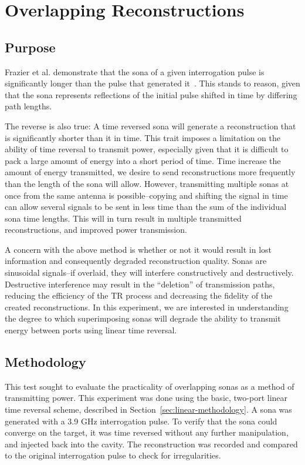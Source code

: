 \section{Overlapping Reconstructions}
\label{sec:overlapping}

\subsection{Purpose}

Frazier et al. demonstrate that the sona of a given interrogation pulse is significantly longer than the pulse that generated it~\cite{nltr-wave-chaotic}. This stands to reason, given that the sona represents reflections of the initial pulse shifted in time by differing path lengths.

The reverse is also true: A time reversed sona will generate a reconstruction that is significantly shorter than it in time. This trait imposes a limitation on the ability of time reversal to transmit power, especially given that it is difficult to pack a large amount of energy into a short period of time. Time increase the amount of energy transmitted, we desire to send reconstructions more frequently than the length of the sona will allow. However, transmitting multiple sonas at once from the same antenna is possible--copying and shifting the signal in time can allow several signals to be sent in less time than the sum of the individual sona time lengths. This will in turn result in multiple transmitted reconstructions, and improved power transmission.

A concern with the above method is whether or not it would result in lost information and consequently degraded reconstruction quality. Sonas are sinusoidal signals--if overlaid, they will interfere constructively and destructively. Destructive interference may result in the ``deletion'' of transmission paths, reducing the efficiency of the TR process and decreasing the fidelity of the created reconstructions. In this experiment, we are interested in understanding the degree to which superimposing sonas will degrade the ability to transmit energy between ports using linear time reversal.

\subsection{Methodology}

This test sought to evaluate the practicality of overlapping sonas as a method of transmitting power. This experiment was done using the basic, two-port linear time reversal scheme, described in Section~\ref{sec:linear-methodology}. A sona was generated with a 3.9 GHz interrogation pulse. To verify that the sona could converge on the target, it was time reversed without any further manipulation, and injected back into the cavity. The reconstruction was recorded and compared to the original interrogation pulse to check for irregularities.

